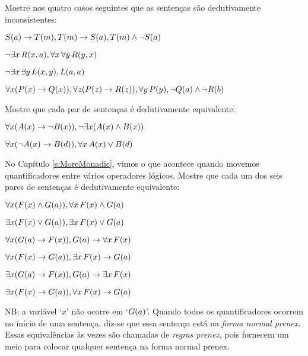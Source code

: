 
\practiceproblems
\problempart
 Mostre nos quatro casos seguintes que as sentenças são dedutivamente inconsistentes:
\begin{earg}
\item $\mathord{S}(a)\rightarrow \mathord{T}(m), \mathord{T}(m) \rightarrow \mathord{S}(a), \mathord{T}(m) \wedge \neg \mathord{S}(a)$
\item $\neg\exists x\,\mathord{R}(x,a), \forall x\, \forall y\,\mathord{R}(y,x)$
\item $\neg\exists x\, \exists y\,\mathord{L}(x,y), \mathord{L}(a,a)$
\item $\forall x(\mathord{P}(x) \rightarrow \mathord{Q}(x)), \forall z(\mathord{P}(z) \rightarrow \mathord{R}(z)), \forall y\,\mathord{P}(y), \neg \mathord{Q}(a) \wedge \neg \mathord{R}(b)$
\end{earg}

\problempart
Mostre que cada par de sentenças é dedutivamente equivalente:
\begin{earg}
\item $\forall x (\mathord{A}(x)\rightarrow \neg \mathord{B}(x)), \neg\exists x(\mathord{A}(x) \wedge \mathord{B}(x))$
\item $\forall x (\neg\mathord{A}(x)\rightarrow \mathord{B}(d)), \forall x\,\mathord{A}(x) \vee \mathord{B}(d)$
\end{earg}

\problempart
No Capítulo \ref{s:MoreMonadic}, vimos o que acontece quando movemos quantificadores entre  vários operadores lógicos. Mostre que cada um dos seis pares de sentenças é dedutivamente equivalente:
\begin{earg}
\item $\forall x(\mathord{F}(x) \wedge \mathord{G}(a)), \forall x\,\mathord{F}(x) \wedge \mathord{G}(a)$
\item $\exists x(\mathord{F}(x) \vee \mathord{G}(a)), \exists x\,\mathord{F}(x) \vee \mathord{G}(a)$
\item $\forall x(\mathord{G}(a) \rightarrow \mathord{F}(x)), \mathord{G}(a) \rightarrow \forall x\,\mathord{F}(x)$
\item $\forall x(\mathord{F}(x) \rightarrow \mathord{G}(a)), \exists x\,\mathord{F}(x) \rightarrow \mathord{G}(a)$
\item $\exists x(\mathord{G}(a) \rightarrow \mathord{F}(x)), \mathord{G}(a) \rightarrow \exists x\,\mathord{F}(x)$
\item $\exists x(\mathord{F}(x) \rightarrow \mathord{G}(a)), \forall x\,\mathord{F}(x) \rightarrow \mathord{G}(a)$
\end{earg}
NB: a variável `$x$' não ocorre em `$\mathord{G}(a)$'. Quando todos os quantificadores ocorrem no início de uma sentença, diz-se que essa sentença está na \emph{forma normal prenex}. Essas equivalências às vezes são chamadas de \emph{regras prenex}, pois fornecem um meio para colocar qualquer sentença na forma normal prenex.

